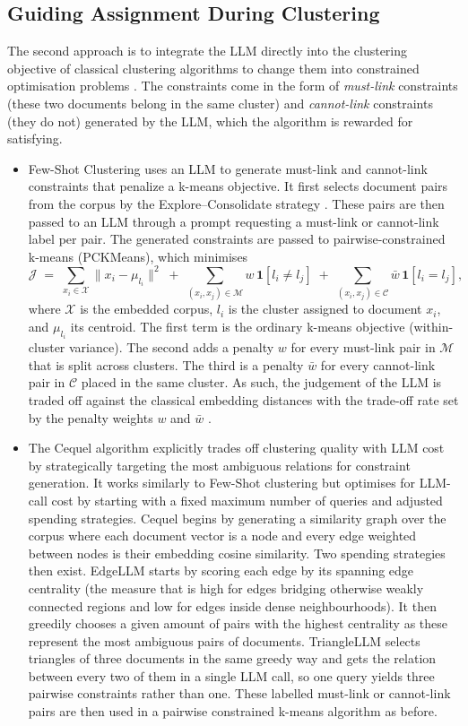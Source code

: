 \documentclass[11pt,a4paper,oneside]{report}
\begin{document}
\subsection{Guiding Assignment During Clustering}\label{sec:during}

The second approach is to integrate the LLM directly into the clustering objective of classical clustering algorithms to change them into constrained optimisation problems \citep{wagstaff2001constrained}. The constraints come in the form of \emph{must-link} constraints (these two documents belong in the same cluster) and \emph{cannot-link} constraints (they do not) generated by the LLM, which the algorithm is rewarded for satisfying.
\begin{itemize}
\item Few-Shot Clustering uses an LLM to generate must-link and cannot-link constraints that penalize a k-means objective. It first selects document pairs from the corpus by the Explore--Consolidate strategy \citep{basu2004active}. These pairs are then passed to an LLM through a prompt requesting a must-link or cannot-link label per pair. The generated constraints are passed to pairwise-constrained k-means (PCKMeans), which minimises
\[
\mathcal{J} \;=\; \sum_{x_i \in \mathcal{X}} \lVert x_i - \mu_{l_i} \rVert^2 \;+\; \sum_{(x_i, x_j) \in \mathcal{M}} w \,\mathbf{1}\!\left[ l_i \neq l_j \right] \;+\; \sum_{(x_i, x_j) \in \mathcal{C}} \bar{w} \,\mathbf{1}\!\left[ l_i = l_j \right],
\]
where $\mathcal{X}$ is the embedded corpus, $l_i$ is the cluster assigned to document $x_i$, and $\mu_{l_i}$ its centroid. The first term is the ordinary k-means objective (within-cluster variance). The second adds a penalty $w$ for every must-link pair in $\mathcal{M}$ that is split across clusters. The third is a penalty $\bar{w}$ for every cannot-link pair in $\mathcal{C}$ placed in the same cluster. As such, the judgement of the LLM is traded off against the classical embedding distances with the trade-off rate set by the penalty weights $w$ and $\bar{w}$ \citep{viswanathan2024fewshot}.
\item The Cequel algorithm \citep{wang2025cequel} explicitly trades off clustering quality with LLM cost by strategically targeting the most ambiguous relations for constraint generation. It works similarly to Few-Shot clustering but optimises for LLM-call cost by starting with a fixed maximum number of queries and adjusted spending strategies. Cequel begins by generating a similarity graph over the corpus where each document vector is a node and every edge weighted between nodes is their embedding cosine similarity. Two spending strategies then exist. EdgeLLM starts by scoring each edge by its spanning edge centrality (the measure that is high for edges bridging otherwise weakly connected regions and low for edges inside dense neighbourhoods). It then greedily chooses a given amount of pairs with the highest centrality as these represent the most ambiguous pairs of documents. TriangleLLM selects triangles of three documents in the same greedy way and gets the relation between every two of them in a single LLM call, so one query yields three pairwise constraints rather than one. These labelled must-link or cannot-link pairs are then used in a pairwise constrained k-means algorithm as before.

\end{itemize}
\end{document}
